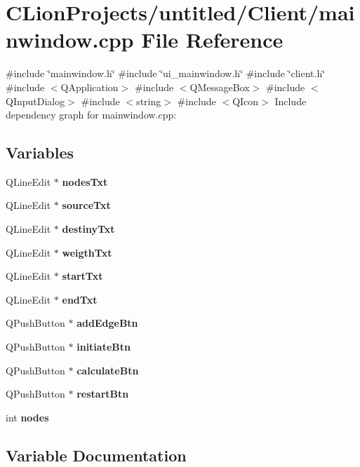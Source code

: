 \section{C\+Lion\+Projects/untitled/\+Client/mainwindow.cpp File Reference}
\label{mainwindow_8cpp}
{\ttfamily \#include \char`\"{}mainwindow.\+h\char`\"{}}\newline
{\ttfamily \#include \char`\"{}ui\+\_\+mainwindow.\+h\char`\"{}}\newline
{\ttfamily \#include \char`\"{}client.\+h\char`\"{}}\newline
{\ttfamily \#include $<$Q\+Application$>$}\newline
{\ttfamily \#include $<$Q\+Message\+Box$>$}\newline
{\ttfamily \#include $<$Q\+Input\+Dialog$>$}\newline
{\ttfamily \#include $<$string$>$}\newline
{\ttfamily \#include $<$Q\+Icon$>$}\newline
Include dependency graph for mainwindow.\+cpp\+:
\subsection*{Variables}
\begin{DoxyCompactItemize}
\item 
Q\+Line\+Edit $\ast$ \textbf{ nodes\+Txt}
\item 
Q\+Line\+Edit $\ast$ \textbf{ source\+Txt}
\item 
Q\+Line\+Edit $\ast$ \textbf{ destiny\+Txt}
\item 
Q\+Line\+Edit $\ast$ \textbf{ weigth\+Txt}
\item 
Q\+Line\+Edit $\ast$ \textbf{ start\+Txt}
\item 
Q\+Line\+Edit $\ast$ \textbf{ end\+Txt}
\item 
Q\+Push\+Button $\ast$ \textbf{ add\+Edge\+Btn}
\item 
Q\+Push\+Button $\ast$ \textbf{ initiate\+Btn}
\item 
Q\+Push\+Button $\ast$ \textbf{ calculate\+Btn}
\item 
Q\+Push\+Button $\ast$ \textbf{ restart\+Btn}
\item 
int \textbf{ nodes}
\end{DoxyCompactItemize}


\subsection{Variable Documentation}
\mbox{\label{mainwindow_8cpp_aa1acc1be0128f7de086fb6a03cf8f0a2}} 
